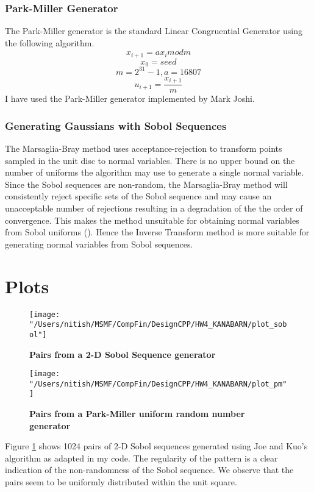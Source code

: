 \documentclass[letterpaper,twoside,11pt,fleqn]{article}
\begin{document}
\subsubsection*{Park-Miller Generator}
The Park-Miller generator is the standard Linear Congruential Generator using the following algorithm.
\[
x_{i+1} = a x_i mod m
\]
\[ x_0 = seed \]
\[ m = 2^{31} - 1, a = 16807 \]
\[
u_{i+1} = \frac{x_{i+1}}{m}
\]
I have used the Park-Miller generator implemented by Mark Joshi.

\subsubsection*{Generating Gaussians with Sobol Sequences}
The Marsaglia-Bray method uses acceptance-rejection to transform points sampled in the unit disc to normal variables.  There is no upper bound on the number of uniforms the algorithm may use to generate a single normal variable.  Since the Sobol sequences are non-random, the Marsaglia-Bray method will consistently reject specific sets of the Sobol sequence and may cause an unacceptable number of rejections resulting in a degradation of the the order of convergence. This makes the method unsuitable for obtaining normal variables from Sobol uniforms (\cite{glasserman}).
Hence the Inverse Transform method is more suitable for generating normal variables from Sobol sequences.


\section*{Plots}

\begin{figure}[htbp]
\begin{center}
\texttt{[image: "/Users/nitish/MSMF/CompFin/DesignCPP/HW4\_KANABARN/plot\_sobol"]}
\caption{{\bf Pairs from a 2-D Sobol Sequence generator}}
\label{plot_sobol}
\end{center}
\end{figure}

\begin{figure}[htbp]
\begin{center}
\texttt{[image: "/Users/nitish/MSMF/CompFin/DesignCPP/HW4\_KANABARN/plot\_pm"]}
\caption{{\bf Pairs from a Park-Miller uniform random number generator}}
\label{plot_pm}
\end{center}
\end{figure}

Figure \ref{plot_sobol} shows 1024 pairs of 2-D Sobol sequences generated using Joe and Kuo's algorithm as adapted in my code. The regularity of the pattern is a clear indication of the non-randomness of the Sobol sequence.  We observe that the pairs seem to be uniformly distributed within the unit square.
\end{document}
